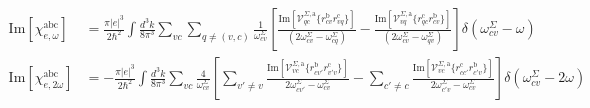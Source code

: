 \documentclass{article}
\begin{document}
\begin{equation*}\label{eq:chis}
\begin{split}
\mathrm{Im}[\chi^{\mathrm{a}\mathrm{b}\mathrm{c}}_{e,\omega}]&= 
\frac{\pi |e|^3}{2\hbar^2}
\int \frac{d^{3}k}{8\pi^3}
\sum_{vc}\sum_{q\neq(v,c)}\frac{1}{\omega^\Sigma_{cv}}
\left[
\frac{\mathrm{Im}[\mathcal{V}^{\Sigma,\mathrm{a}}_{qc}
\{r^{\mathrm{b}}_{cv}r^{\mathrm{c}}_{vq}\}]}
{(2\omega^\Sigma_{cv}-\omega^\Sigma_{cq})} 
-\frac{\mathrm{Im}[\mathcal{V}^{\Sigma,\mathrm{a}}_{vq}
\{r^{\mathrm{c}}_{qc}r^{\mathrm{b}}_{cv}\}]}
{(2\omega^\Sigma_{cv}-\omega^\Sigma_{qv})}
\right]\delta(\omega^\Sigma_{cv}-\omega)\\
\mathrm{Im}[\chi^{\mathrm{a}\mathrm{b}\mathrm{c}}_{e,2\omega}]&= 
-\frac{\pi |e|^3}{2\hbar^2}
\int \frac{d^{3}k}{8\pi^3}
\sum_{vc}\frac{4}{\omega^\Sigma_{cv}}
\left[
\sum_{v'\ne
  v}\frac{\mathrm{Im}[\mathcal{V}^{\Sigma,\mathrm{a}}_{vc}
  \{r^{\mathrm{b}}_{cv'}r^{\mathrm{c}}_{v'v}\}]}
{2\omega^\Sigma_{cv'}-\omega^\Sigma_{cv}}
- \sum_{c'\ne
  c}\frac{\mathrm{Im}[\mathcal{V}^{\Sigma,\mathrm{a}}_{vc}
  \{r^{\mathrm{c}}_{cc'}r^{\mathrm{b}}_{c'v}\}]}
{2\omega^\Sigma_{c'v}-\omega^\Sigma_{cv}}
\right]\delta(\omega^\Sigma_{cv}-2\omega)
\end{split}
\end{equation*}
\end{document}
